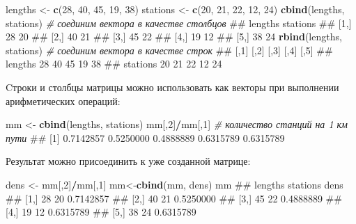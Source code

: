 \documentclass[]{book}
\newenvironment{Shaded}{\begin{snugshade}}{\end{snugshade}}
\newcommand{\KeywordTok}[1]{\textcolor[rgb]{0.13,0.29,0.53}{\textbf{#1}}}
\newcommand{\DecValTok}[1]{\textcolor[rgb]{0.00,0.00,0.81}{#1}}
\newcommand{\StringTok}[1]{\textcolor[rgb]{0.31,0.60,0.02}{#1}}
\newcommand{\CommentTok}[1]{\textcolor[rgb]{0.56,0.35,0.01}{\textit{#1}}}
\newcommand{\OperatorTok}[1]{\textcolor[rgb]{0.81,0.36,0.00}{\textbf{#1}}}
\newcommand{\NormalTok}[1]{#1}
\begin{document}
\begin{Shaded}
\begin{Highlighting}[]
\NormalTok{lengths <-}\StringTok{ }\KeywordTok{c}\NormalTok{(}\DecValTok{28}\NormalTok{, }\DecValTok{40}\NormalTok{, }\DecValTok{45}\NormalTok{, }\DecValTok{19}\NormalTok{, }\DecValTok{38}\NormalTok{)}
\NormalTok{stations <-}\StringTok{ }\KeywordTok{c}\NormalTok{(}\DecValTok{20}\NormalTok{, }\DecValTok{21}\NormalTok{, }\DecValTok{22}\NormalTok{, }\DecValTok{12}\NormalTok{, }\DecValTok{24}\NormalTok{)}
\KeywordTok{cbind}\NormalTok{(lengths, stations)  }\CommentTok{# соединим вектора в качестве столбцов}
\NormalTok{##      lengths stations}
\NormalTok{## [1,]      28       20}
\NormalTok{## [2,]      40       21}
\NormalTok{## [3,]      45       22}
\NormalTok{## [4,]      19       12}
\NormalTok{## [5,]      38       24}
\KeywordTok{rbind}\NormalTok{(lengths, stations)  }\CommentTok{# соединим вектора в качестве строк}
\NormalTok{##          [,1] [,2] [,3] [,4] [,5]}
\NormalTok{## lengths    28   40   45   19   38}
\NormalTok{## stations   20   21   22   12   24}
\end{Highlighting}
\end{Shaded}

Cтроки и столбцы матрицы можно использовать как векторы при выполнении
арифметических операций:

\begin{Shaded}
\begin{Highlighting}[]
\NormalTok{mm <-}\StringTok{ }\KeywordTok{cbind}\NormalTok{(lengths, stations)}
\NormalTok{mm[,}\DecValTok{2}\NormalTok{]}\OperatorTok{/}\NormalTok{mm[,}\DecValTok{1}\NormalTok{]  }\CommentTok{# количество станций на 1 км пути}
\NormalTok{## [1] 0.7142857 0.5250000 0.4888889 0.6315789 0.6315789}
\end{Highlighting}
\end{Shaded}

Результат можно присоединить к уже созданной матрице:

\begin{Shaded}
\begin{Highlighting}[]
\NormalTok{dens <-}\StringTok{ }\NormalTok{mm[,}\DecValTok{2}\NormalTok{]}\OperatorTok{/}\NormalTok{mm[,}\DecValTok{1}\NormalTok{]}
\NormalTok{mm<-}\KeywordTok{cbind}\NormalTok{(mm, dens)}
\NormalTok{mm}
\NormalTok{##      lengths stations      dens}
\NormalTok{## [1,]      28       20 0.7142857}
\NormalTok{## [2,]      40       21 0.5250000}
\NormalTok{## [3,]      45       22 0.4888889}
\NormalTok{## [4,]      19       12 0.6315789}
\NormalTok{## [5,]      38       24 0.6315789}
\end{Highlighting}
\end{Shaded}
\end{document}
